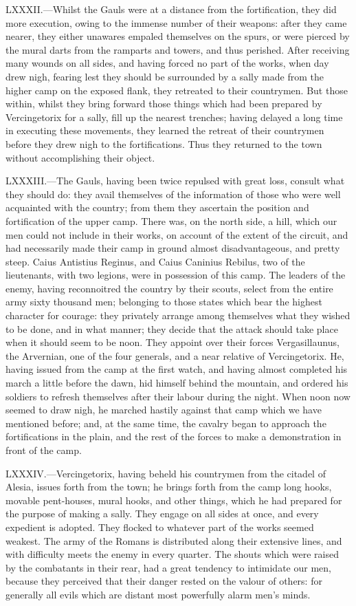 LXXXII.—Whilst the Gauls were at a distance from the fortification,
they did more execution, owing to the immense number of their weapons:
after they came nearer, they either unawares empaled themselves on the
spurs, or were pierced by the mural darts from the ramparts and towers,
and thus perished. After receiving many wounds on all sides, and having
forced no part of the works, when day drew nigh, fearing lest they
should be surrounded by a sally made from the higher camp on the exposed
flank, they retreated to their countrymen. But those within, whilst they
bring forward those things which had been prepared by Vercingetorix for
a sally, fill up the nearest trenches; having delayed a long time in
executing these movements, they learned the retreat of their countrymen
before they drew nigh to the fortifications. Thus they returned to the
town without accomplishing their object.

LXXXIII.—The Gauls, having been twice repulsed with great loss, consult
what they should do: they avail themselves of the information of those
who were well acquainted with the country; from them they ascertain the
position and fortification of the upper camp. There was, on the north
side, a hill, which our men could not include in their works, on account
of the extent of the circuit, and had necessarily made their camp in
ground almost disadvantageous, and pretty steep. Caius Antistius
Reginus, and Caius Caninius Rebilus, two of the lieutenants, with two
legions, were in possession of this camp. The leaders of the enemy,
having reconnoitred the country by their scouts, select from the entire
army sixty thousand men; belonging to those states which bear the
highest character for courage: they privately arrange among themselves
what they wished to be done, and in what manner; they decide that the
attack should take place when it should seem to be noon. They appoint
over their forces Vergasillaunus, the Arvernian, one of the four
generals, and a near relative of Vercingetorix. He, having issued from
the camp at the first watch, and having almost completed his march a
little before the dawn, hid himself behind the mountain, and ordered his
soldiers to refresh themselves after their labour during the night. When
noon now seemed to draw nigh, he marched hastily against that camp which
we have mentioned before; and, at the same time, the cavalry began to
approach the fortifications in the plain, and the rest of the forces to
make a demonstration in front of the camp.

LXXXIV.—Vercingetorix, having beheld his countrymen from the citadel of
Alesia, issues forth from the town; he brings forth from the camp long
hooks, movable pent-houses, mural hooks, and other things, which he had
prepared for the purpose of making a sally. They engage on all sides at
once, and every expedient is adopted. They flocked to whatever part of
the works seemed weakest. The army of the Romans is distributed along
their extensive lines, and with difficulty meets the enemy in every
quarter. The shouts which were raised by the combatants in their rear,
had a great tendency to intimidate our men, because they perceived that
their danger rested on the valour of others: for generally all evils
which are distant most powerfully alarm men's minds.


